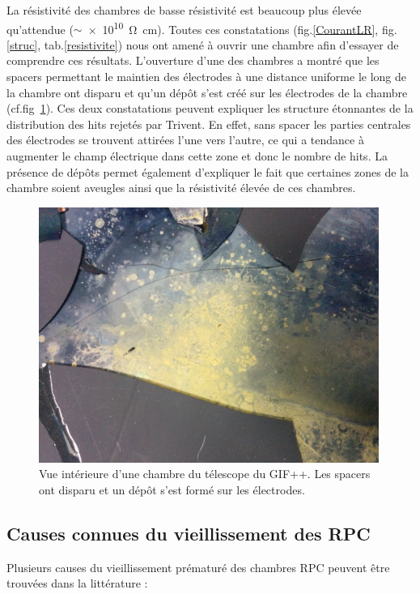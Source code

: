 La résistivité des chambres de basse résistivité est beaucoup plus élevée qu'attendue ($\sim$\SI{e10}{\ohm.\centi\meter}). Toutes ces constatations (fig.\ref{CourantLR}, fig.\ref{struc}, tab.\ref{resistivite}) nous ont amené à ouvrir une chambre afin d'essayer de comprendre ces résultats.
\vspace{0.4cm}
\newpage
L'ouverture d'une des chambres a montré que les spacers permettant le maintien des électrodes à une distance uniforme le long de la chambre ont disparu et qu'un dépôt s'est créé sur les électrodes de la chambre (cf.fig~\ref{depot}). Ces deux constatations peuvent expliquer les structure étonnantes de la distribution des hits rejetés par Trivent. En effet, sans spacer les parties centrales des électrodes se trouvent attirées l'une vers l'autre, ce qui a tendance à augmenter le champ électrique dans cette zone et donc le nombre de hits. La présence de dépôts permet également d'expliquer le fait que certaines zones de la chambre soient aveugles ainsi que la résistivité élevée de ces chambres.

\begin{figure}[!ht]
	\centering
	\includegraphics[width=0.99\textwidth]{GLA/depot.jpg}
	\caption{Vue intérieure d'une chambre du télescope du GIF++. Les spacers ont disparu et un dépôt s'est formé sur les électrodes.}
	\label{depot}
\end{figure}

\subsection{Causes connues du vieillissement des RPC }
Plusieurs causes du vieillissement prématuré des chambres RPC peuvent être trouvées dans la littérature :

